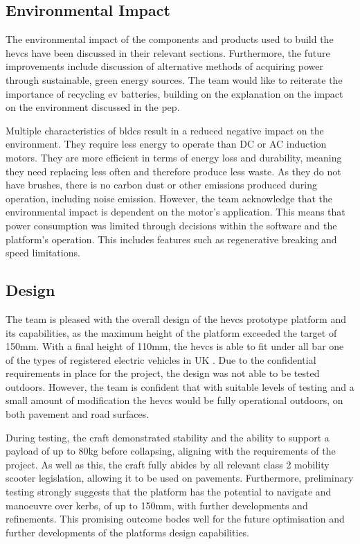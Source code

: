 \documentclass [12pt]{article}
\begin{document}
\subsection{Environmental Impact}

The environmental impact of the components and products used to build the \gls{hevcs} have been discussed in their relevant sections. Furthermore, the future improvements include discussion of alternative methods of acquiring power through sustainable, green energy sources. The team would like to reiterate the importance of recycling \gls{ev} batteries, building on the explanation on the impact on the environment discussed in the \gls{pep}.

Multiple characteristics of \gls{bldc}s result in a reduced negative impact on the environment. They require less energy to operate than DC or AC induction motors. They are more efficient in terms of energy loss and durability, meaning they need replacing less often and therefore produce less waste. As they do not have brushes, there is no carbon dust or other emissions produced during operation, including noise emission. However, the team acknowledge that the environmental impact is dependent on the motor’s application. This means that power consumption was limited through decisions within the software and the platform’s operation. This includes features such as regenerative breaking and speed limitations.

\subsection{Design}

The team is pleased with the overall design of the \gls{hevcs} prototype platform and its capabilities, as the maximum height of the platform exceeded the target of 150mm. With a final height of 110mm, the \gls{hevcs} is able to fit under all bar one of the types of registered electric vehicles in UK \cite{carsinit}. Due to the confidential requirements in place for the project, the design was not able to be tested outdoors. However, the team is confident that with suitable levels of testing and a small amount of modification the \gls{hevcs} would be fully operational outdoors, on both pavement and road surfaces.

During testing, the craft demonstrated stability and the ability to support a payload of up to 80kg before collapsing, aligning with the requirements of the project. As well as this, the craft fully abides by all relevant class 2 mobility scooter legislation, allowing it to be used on pavements.  Furthermore, preliminary testing strongly suggests that the platform has the potential to navigate and manoeuvre over kerbs, of up to 150mm, with further developments and refinements. This promising outcome bodes well for the future optimisation and further developments of the platforms design capabilities.
\end{document}
